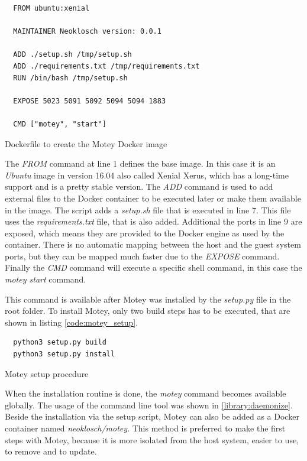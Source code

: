 \begin{listing}[H]
  \begin{verbatim}
  FROM ubuntu:xenial

  MAINTAINER Neoklosch version: 0.0.1

  ADD ./setup.sh /tmp/setup.sh
  ADD ./requirements.txt /tmp/requirements.txt
  RUN /bin/bash /tmp/setup.sh

  EXPOSE 5023 5091 5092 5094 5094 1883

  CMD ["motey", "start"]
  \end{verbatim}
  \caption{Dockerfile to create the Motey Docker image}
  \label{code:motey_dockerfile}
\end{listing}

The \textit{FROM} command at line 1 defines the base image.
In this case it is an \textit{Ubuntu} image in version 16.04 also called Xenial Xerus, which has a long-time support and is a pretty stable version.
The \textit{ADD} command is used to add external files to the Docker container to be executed later or make them available in the image.
The script adds a \textit{setup.sh} file that is executed in line 7.
This file uses the \textit{requirements.txt} file, that is also added.
Additional the ports in line 9 are exposed, which means they are provided to the Docker engine as used by the container.
There is no automatic mapping between the host and the guest system ports, but they can be mapped much faster due to the \textit{EXPOSE} command.
Finally the \textit{CMD} command will execute a specific shell command, in this case the \textit{motey start} command.\newline

This command is available after Motey was installed by the \textit{setup.py} file in the root folder.
To install Motey, only two build steps has to be executed, that are shown in listing \ref{code:motey_setup}.

\begin{listing}[H]
  \begin{verbatim}
  python3 setup.py build
  python3 setup.py install
  \end{verbatim}
  \caption{Motey setup procedure}
  \label{code:motey_setup}
\end{listing}

When the installation routine is done, the \textit{motey} command becomes available globally.
The usage of the command line tool was shown in \ref{library:daemonize}.
Beside the installation via the setup script, Motey can also be added as a Docker container named \textit{neoklosch/motey}.
This method is preferred to make the first steps with Motey, because it is more isolated from the host system, easier to use, to remove and to update.

